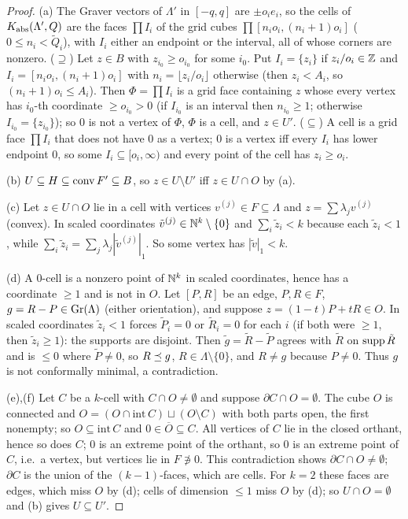 \begin{proof}
(a) The Graver vectors of $\Lambda'$ in $[-q,q]$ are $\pm o_ie_i$, so the cells of $K_{\mathrm{abs}}(\Lambda',Q)$ are the faces $\prod I_i$ of the grid cubes $\prod[n_io_i,(n_i+1)o_i]$ ($0\le n_i<\tilde Q_i$), with $I_i$ either an endpoint or the interval, all of whose corners are nonzero. ($\supseteq$) Let $z\in B$ with $z_{i_0}\ge o_{i_0}$ for some $i_0$. Put $I_i=\{z_i\}$ if $z_i/o_i\in\mathbb Z$ and $I_i=[n_io_i,(n_i+1)o_i]$ with $n_i=\lfloor z_i/o_i\rfloor$ otherwise (then $z_i<A_i$, so $(n_i+1)o_i\le A_i$). Then $\Phi=\prod I_i$ is a grid face containing $z$ whose every vertex has $i_0$-th coordinate $\ge o_{i_0}>0$ (if $I_{i_0}$ is an interval then $n_{i_0}\ge1$; otherwise $I_{i_0}=\{z_{i_0}\}$); so $0$ is not a vertex of $\Phi$, $\Phi$ is a cell, and $z\in U'$. ($\subseteq$) A cell is a grid face $\prod I_i$ that does not have $0$ as a vertex; $0$ is a vertex iff every $I_i$ has lower endpoint $0$, so some $I_i\subseteq[o_i,\infty)$ and every point of the cell has $z_i\ge o_i$.

(b) $U\subseteq H\subseteq\operatorname{conv} F'\subseteq B$, so $z\in U\setminus U'$ iff $z\in U\cap O$ by (a).

(c) Let $z\in U\cap O$ lie in a cell with vertices $v^{(j)}\in F\subseteq\Lambda$ and $z=\sum\lambda_jv^{(j)}$ (convex). In scaled coordinates $\tilde v^{(j)}\in\mathbb N^k\setminus\{0\}$ and $\sum_i\tilde z_i<k$ because each $\tilde z_i<1$, while $\sum_i\tilde z_i=\sum_j\lambda_j|\tilde v^{(j)}|_1$. So some vertex has $|\tilde v|_1<k$.

(d) A $0$-cell is a nonzero point of $\mathbb N^k$ in scaled coordinates, hence has a coordinate $\ge1$ and is not in $O$. Let $[P,R]$ be an edge, $P,R\in F$, $g=R-P\in\operatorname{Gr}(\Lambda)$ (either orientation), and suppose $z=(1-t)P+tR\in O$. In scaled coordinates $\tilde z_i<1$ forces $\tilde P_i=0$ or $\tilde R_i=0$ for each $i$ (if both were $\ge1$, then $\tilde z_i\ge1$): the supports are disjoint. Then $\tilde g=\tilde R-\tilde P$ agrees with $\tilde R$ on $\operatorname{supp}\tilde R$ and is $\le0$ where $\tilde P\ne0$, so $R\preceq g$, $R\in\Lambda\setminus\{0\}$, and $R\ne g$ because $P\ne0$. Thus $g$ is not conformally minimal, a contradiction.

(e),(f) Let $C$ be a $k$-cell with $C\cap O\ne\emptyset$ and suppose $\partial C\cap O=\emptyset$. The cube $O$ is connected and $O=(O\cap\mathrm{int}\,C)\sqcup(O\setminus C)$ with both parts open, the first nonempty; so $O\subseteq\mathrm{int}\,C$ and $0\in\overline O\subseteq C$. All vertices of $C$ lie in the closed orthant, hence so does $C$; $0$ is an extreme point of the orthant, so $0$ is an extreme point of $C$, i.e.\ a vertex, but vertices lie in $F\not\ni0$. This contradiction shows $\partial C\cap O\ne\emptyset$; $\partial C$ is the union of the $(k-1)$-faces, which are cells. For $k=2$ these faces are edges, which miss $O$ by (d); cells of dimension $\le1$ miss $O$ by (d); so $U\cap O=\emptyset$ and (b) gives $U\subseteq U'$. \qedhere
\end{proof}
